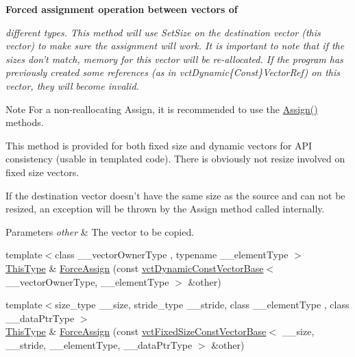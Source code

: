 \begin{Indent}{\bf Forced assignment operation between vectors of}\par
{\em different types. This method will use Set\-Size on the destination vector (this vector) to make sure the assignment will work. It is important to note that if the sizes don't match, memory for this vector will be re-\/allocated. If the program has previously created some references (as in vct\-Dynamic\{Const\}Vector\-Ref) on this vector, they will become invalid.

\begin{DoxyNote}{Note}
For a non-\/reallocating Assign, it is recommended to use the \hyperlink{classvct_dynamic_vector_base_a0d174f0a9557fd562de13324c14e0b92}{Assign()} methods.

This method is provided for both fixed size and dynamic vectors for A\-P\-I consistency (usable in templated code). There is obviously not resize involved on fixed size vectors.

If the destination vector doesn't have the same size as the source and can not be resized, an exception will be thrown by the Assign method called internally.
\end{DoxyNote}

\begin{DoxyParams}{Parameters}
{\em other} & The vector to be copied. \\
\hline
\end{DoxyParams}
}\begin{DoxyCompactItemize}
\item 
{\footnotesize template$<$class \-\_\-\-\_\-vector\-Owner\-Type , typename \-\_\-\-\_\-element\-Type $>$ }\\\hyperlink{classvct_dynamic_const_vector_base_a39da273523717f678f54d3321ebca3dd}{This\-Type} \& \hyperlink{classvct_dynamic_vector_base_a68ad74bbcd1f57319a155d6310683088}{Force\-Assign} (const \hyperlink{classvct_dynamic_const_vector_base}{vct\-Dynamic\-Const\-Vector\-Base}$<$ \-\_\-\-\_\-vector\-Owner\-Type, \-\_\-\-\_\-element\-Type $>$ \&other)
\item 
{\footnotesize template$<$size\-\_\-type \-\_\-\-\_\-size, stride\-\_\-type \-\_\-\-\_\-stride, class \-\_\-\-\_\-element\-Type , class \-\_\-\-\_\-data\-Ptr\-Type $>$ }\\\hyperlink{classvct_dynamic_const_vector_base_a39da273523717f678f54d3321ebca3dd}{This\-Type} \& \hyperlink{classvct_dynamic_vector_base_ac16a1162151c26e5a12f38e0eaa00c1c}{Force\-Assign} (const \hyperlink{classvct_fixed_size_const_vector_base}{vct\-Fixed\-Size\-Const\-Vector\-Base}$<$ \-\_\-\-\_\-size, \-\_\-\-\_\-stride, \-\_\-\-\_\-element\-Type, \-\_\-\-\_\-data\-Ptr\-Type $>$ \&other)
\end{DoxyCompactItemize}
\end{Indent}
